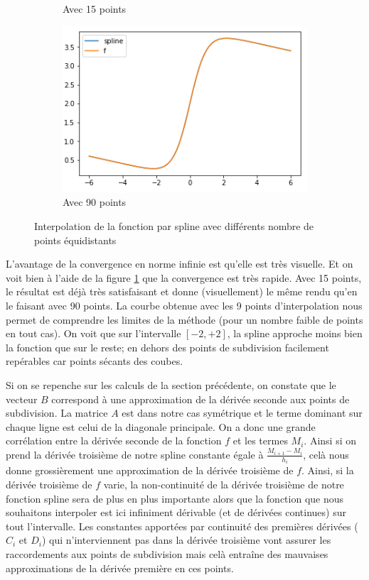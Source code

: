 \begin{figure}[h]
\begin{subfigure}[b]{0.4\linewidth}
    \caption{Avec 15 points}
  \end{subfigure}
  \begin{subfigure}[b]{0.4\linewidth}
    \includegraphics[width=\linewidth]{fig8}
    \caption{Avec 90 points}
  \end{subfigure}
  \caption{Interpolation de la fonction par spline avec différents nombre de points équidistants}
  \label{fig:6:fspl}
\end{figure}

L'avantage de la convergence en norme infinie est qu'elle est très visuelle. Et on voit bien à l'aide de la figure \ref{fig:6:fspl} que la convergence est très rapide.
Avec 15 points, le résultat est déjà très satisfaisant et donne (visuellement) le même rendu qu'en le faisant avec 90 points.
La courbe obtenue avec les 9 points d'interpolation nous permet de comprendre les limites de la méthode (pour un nombre faible de points en tout cas).
On voit que sur l'intervalle $[-2,+2]$, la spline approche moins bien la fonction que sur le reste; en dehors des points de subdivision facilement repérables car
points sécants des coubes.

Si on se repenche sur les calculs de la section précédente, on constate que le vecteur $B$ correspond à une approximation de la dérivée seconde aux
points de subdivision. La matrice $A$ est dans notre cas symétrique et le terme dominant sur chaque ligne est celui de la diagonale principale. On a donc
une grande corrélation entre la dérivée seconde de la fonction $f$ et les termes $M_i$. Ainsi si on prend la dérivée troisième de notre spline constante égale à
$\frac{M_{i+1} - M_i}{h_i}$, celà nous donne grossièrement une approximation de la dérivée troisième de $f$. Ainsi, si la dérivée troisième de $f$ varie,
la non-continuité de la dérivée troisième de notre fonction spline sera de plus en plus importante alors que la fonction que nous souhaitons interpoler est ici
infiniment dérivable (et de dérivées continues) sur tout l'intervalle. Les constantes apportées par continuité des premières dérivées ($C_i$ et $D_i$) qui
n'interviennent pas dans la dérivée troisième vont assurer les raccordements aux points de subdivision mais celà entraîne des mauvaises approximations
de la dérivée première en ces points.

